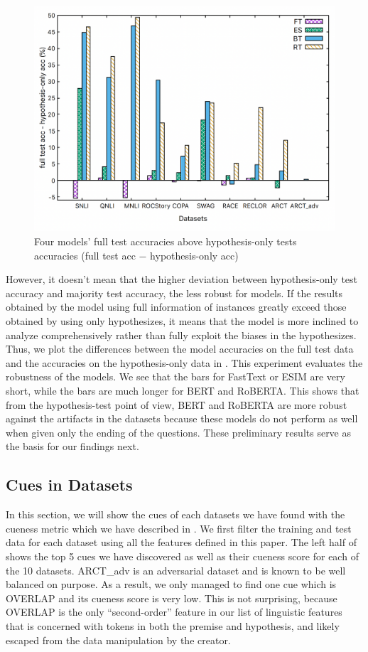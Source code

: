\begin{figure}[ht]
\centering
\includegraphics[width=0.9\columnwidth]{picture/end2.eps}
\caption{Four models' full test accuracies above hypothesis-only tests accuracies (full test acc $-$
hypothesis-only acc)}
\label{fig:ending2}
\end{figure}


However, it doesn't mean that the higher deviation between hypothesis-only test accuracy 
and majority test accuracy, the less robust for models. 
If the results obtained by the model using full information of instances greatly 
exceed those obtained by using only hypothesizes, it means that the model is more 
inclined to analyze comprehensively rather than fully exploit the biases in the hypothesizes.
Thus, we plot the differences between the model accuracies on the full test data
and the accuracies on the hypothesis-only data in . 
This experiment evaluates the robustness of the models. 
We see that the bars for FastText or ESIM are very short, while
the bars are much longer for BERT and RoBERTA. This shows that from 
the hypothesis-test point of view, BERT and RoBERTA are more robust 
against the artifacts in the datasets because these models do not 
perform as well when given only
the ending of the questions. 
These preliminary results serve as the basis for our findings next.

\subsection{Cues in Datasets} 
In this section, we will show the cues of each datasets 
we have found with the cueness metric which we have described 
in . 
We first filter the training and test data for each dataset using all the features
defined in this paper. The left half of  shows the top 5 cues we have discovered
as well as their cueness score for each of the 10 datasets. ARCT\_adv is an adversarial dataset
and is known to be well balanced on purpose. As a result, we only managed to find one cue
which is OVERLAP and its cueness score is very low. This is not surprising, because
OVERLAP is the only ``second-order'' feature in our list of linguistic features that
is concerned with tokens in both the premise and hypothesis, and likely escaped from
the data manipulation by the creator. 


